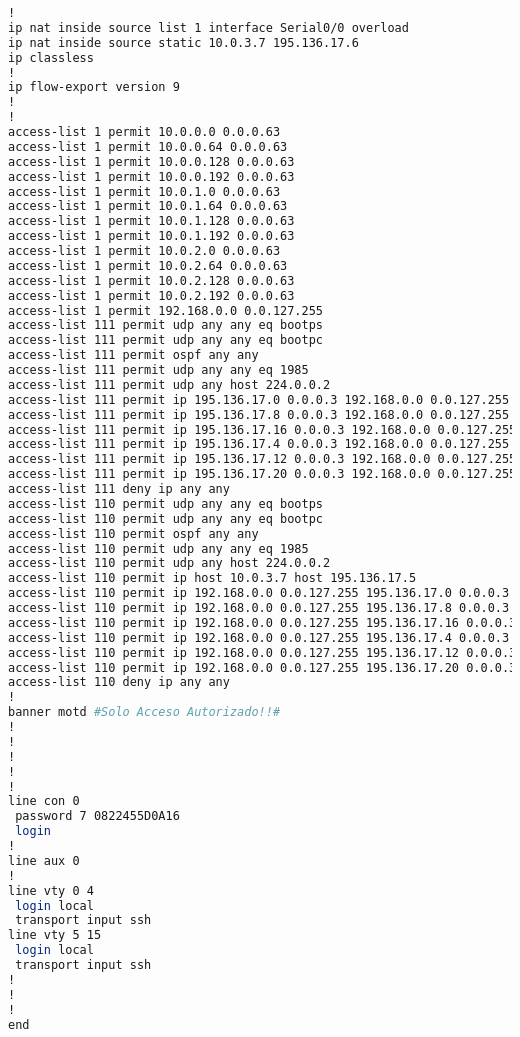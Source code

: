 \begin{lstlisting}[language=Bash, caption={Configuración Completa Router Principal}]
!
ip nat inside source list 1 interface Serial0/0 overload
ip nat inside source static 10.0.3.7 195.136.17.6 
ip classless
!
ip flow-export version 9
!
!
access-list 1 permit 10.0.0.0 0.0.0.63
access-list 1 permit 10.0.0.64 0.0.0.63
access-list 1 permit 10.0.0.128 0.0.0.63
access-list 1 permit 10.0.0.192 0.0.0.63
access-list 1 permit 10.0.1.0 0.0.0.63
access-list 1 permit 10.0.1.64 0.0.0.63
access-list 1 permit 10.0.1.128 0.0.0.63
access-list 1 permit 10.0.1.192 0.0.0.63
access-list 1 permit 10.0.2.0 0.0.0.63
access-list 1 permit 10.0.2.64 0.0.0.63
access-list 1 permit 10.0.2.128 0.0.0.63
access-list 1 permit 10.0.2.192 0.0.0.63
access-list 1 permit 192.168.0.0 0.0.127.255
access-list 111 permit udp any any eq bootps
access-list 111 permit udp any any eq bootpc
access-list 111 permit ospf any any
access-list 111 permit udp any any eq 1985
access-list 111 permit udp any host 224.0.0.2
access-list 111 permit ip 195.136.17.0 0.0.0.3 192.168.0.0 0.0.127.255
access-list 111 permit ip 195.136.17.8 0.0.0.3 192.168.0.0 0.0.127.255
access-list 111 permit ip 195.136.17.16 0.0.0.3 192.168.0.0 0.0.127.255
access-list 111 permit ip 195.136.17.4 0.0.0.3 192.168.0.0 0.0.127.255
access-list 111 permit ip 195.136.17.12 0.0.0.3 192.168.0.0 0.0.127.255
access-list 111 permit ip 195.136.17.20 0.0.0.3 192.168.0.0 0.0.127.255
access-list 111 deny ip any any
access-list 110 permit udp any any eq bootps
access-list 110 permit udp any any eq bootpc
access-list 110 permit ospf any any
access-list 110 permit udp any any eq 1985
access-list 110 permit udp any host 224.0.0.2
access-list 110 permit ip host 10.0.3.7 host 195.136.17.5
access-list 110 permit ip 192.168.0.0 0.0.127.255 195.136.17.0 0.0.0.3
access-list 110 permit ip 192.168.0.0 0.0.127.255 195.136.17.8 0.0.0.3
access-list 110 permit ip 192.168.0.0 0.0.127.255 195.136.17.16 0.0.0.3
access-list 110 permit ip 192.168.0.0 0.0.127.255 195.136.17.4 0.0.0.3
access-list 110 permit ip 192.168.0.0 0.0.127.255 195.136.17.12 0.0.0.3
access-list 110 permit ip 192.168.0.0 0.0.127.255 195.136.17.20 0.0.0.3
access-list 110 deny ip any any
!
banner motd #Solo Acceso Autorizado!!#
!
!
!
!
!
line con 0
 password 7 0822455D0A16
 login
!
line aux 0
!
line vty 0 4
 login local
 transport input ssh
line vty 5 15
 login local
 transport input ssh
!
!
!
end
\end{lstlisting}
